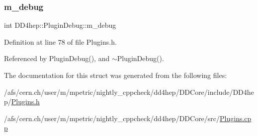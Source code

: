 \subsubsection{\texorpdfstring{m\+\_\+debug}{m\_debug}}
{\footnotesize\ttfamily int D\+D4hep\+::\+Plugin\+Debug\+::m\+\_\+debug}



Definition at line 78 of file Plugins.\+h.



Referenced by Plugin\+Debug(), and $\sim$\+Plugin\+Debug().



The documentation for this struct was generated from the following files\+:\begin{DoxyCompactItemize}
\item 
/afs/cern.\+ch/user/m/mpetric/nightly\+\_\+cppcheck/dd4hep/\+D\+D\+Core/include/\+D\+D4hep/\hyperlink{_plugins_8h}{Plugins.\+h}\item 
/afs/cern.\+ch/user/m/mpetric/nightly\+\_\+cppcheck/dd4hep/\+D\+D\+Core/src/\hyperlink{_plugins_8cpp}{Plugins.\+cpp}\end{DoxyCompactItemize}
